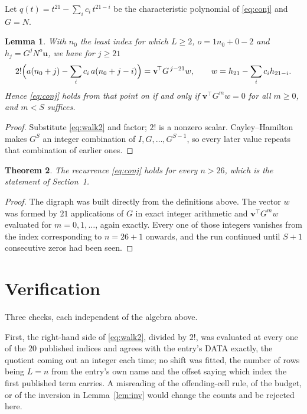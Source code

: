 \documentclass[11pt,a4paper]{article}
\theoremstyle{plain}
\newtheorem{theorem}{Theorem}
\newtheorem{lemma}[theorem]{Lemma}
\theoremstyle{definition}
\begin{document}
Let $q(t)=t^{21}-\sum_i c_i\,t^{21-i}$ be the characteristic polynomial of
\eqref{eq:conj} and $G=N$.

\begin{lemma}\label{lem:crit}
With $n_0$ the least index for which $L\ge2$, $o=1n_0+0-2$ and
$h_j=G^{j}N^{o}\mathbf{u}$, we have for $j\ge21$
\[
2!\Bigl(a(n_0+j)-\sum_i c_i\,a(n_0+j-i)\Bigr)=\mathbf{v}^{\!\top}G^{\,j-21}w,
\qquad w=h_{21}-\sum_i c_i h_{21-i} .
\]
Hence \eqref{eq:conj} holds from that point on if and only if
$\mathbf{v}^{\!\top}G^{m}w=0$ for all $m\ge0$, and $m<S$ suffices.
\end{lemma}

\begin{proof}
Substitute \eqref{eq:walk2} and factor; $2!$ is a nonzero scalar. Cayley--Hamilton
makes $G^{S}$ an integer combination of $I,G,\dots,G^{S-1}$, so every later value repeats
that combination of earlier ones.
\end{proof}

\begin{theorem}
The recurrence \eqref{eq:conj} holds for every $n>26$, which is the statement of
Section~1.
\end{theorem}

\begin{proof}
The digraph was built directly from the definitions above. The vector $w$ was formed by
$21$ applications of $G$ in exact integer arithmetic and $\mathbf{v}^{\!\top}G^{m}w$
evaluated for $m=0,1,\dots$, again exactly. Every one of those integers vanishes from the
index corresponding to $n=26+1$ onwards, and the run continued until $S+1$ consecutive
zeros had been seen.
\end{proof}

\section{Verification}

Three checks, each independent of the algebra above.

First, the right-hand side of \eqref{eq:walk2}, divided by $2!$, was evaluated at every
one of the $20$ published indices and agrees with the entry's DATA exactly, the quotient
coming out an integer each time; no shift was fitted, the number of rows being
$L=n$ from the entry's own name and the offset saying which index the first published
term carries. A misreading of the offending-cell rule, of the budget, or of the inversion in
Lemma~\ref{lem:inv} would change the counts and be rejected here.
\end{document}
